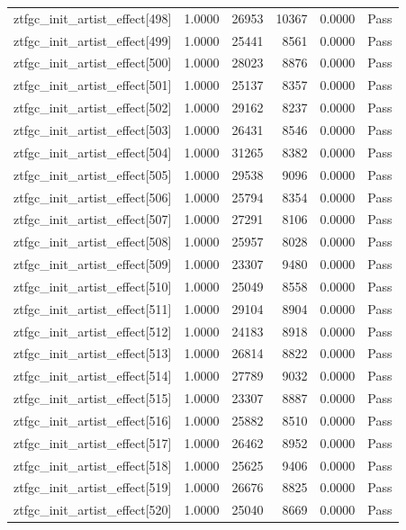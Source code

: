 \begin{table}[htbp]
\begin{tabular}{llrrll}
ztfgc\_init\_artist\_effect[498] & 1.0000 & 26953 & 10367 & 0.0000 & Pass \\
ztfgc\_init\_artist\_effect[499] & 1.0000 & 25441 & 8561 & 0.0000 & Pass \\
ztfgc\_init\_artist\_effect[500] & 1.0000 & 28023 & 8876 & 0.0000 & Pass \\
ztfgc\_init\_artist\_effect[501] & 1.0000 & 25137 & 8357 & 0.0000 & Pass \\
ztfgc\_init\_artist\_effect[502] & 1.0000 & 29162 & 8237 & 0.0000 & Pass \\
ztfgc\_init\_artist\_effect[503] & 1.0000 & 26431 & 8546 & 0.0000 & Pass \\
ztfgc\_init\_artist\_effect[504] & 1.0000 & 31265 & 8382 & 0.0000 & Pass \\
ztfgc\_init\_artist\_effect[505] & 1.0000 & 29538 & 9096 & 0.0000 & Pass \\
ztfgc\_init\_artist\_effect[506] & 1.0000 & 25794 & 8354 & 0.0000 & Pass \\
ztfgc\_init\_artist\_effect[507] & 1.0000 & 27291 & 8106 & 0.0000 & Pass \\
ztfgc\_init\_artist\_effect[508] & 1.0000 & 25957 & 8028 & 0.0000 & Pass \\
ztfgc\_init\_artist\_effect[509] & 1.0000 & 23307 & 9480 & 0.0000 & Pass \\
ztfgc\_init\_artist\_effect[510] & 1.0000 & 25049 & 8558 & 0.0000 & Pass \\
ztfgc\_init\_artist\_effect[511] & 1.0000 & 29104 & 8904 & 0.0000 & Pass \\
ztfgc\_init\_artist\_effect[512] & 1.0000 & 24183 & 8918 & 0.0000 & Pass \\
ztfgc\_init\_artist\_effect[513] & 1.0000 & 26814 & 8822 & 0.0000 & Pass \\
ztfgc\_init\_artist\_effect[514] & 1.0000 & 27789 & 9032 & 0.0000 & Pass \\
ztfgc\_init\_artist\_effect[515] & 1.0000 & 23307 & 8887 & 0.0000 & Pass \\
ztfgc\_init\_artist\_effect[516] & 1.0000 & 25882 & 8510 & 0.0000 & Pass \\
ztfgc\_init\_artist\_effect[517] & 1.0000 & 26462 & 8952 & 0.0000 & Pass \\
ztfgc\_init\_artist\_effect[518] & 1.0000 & 25625 & 9406 & 0.0000 & Pass \\
ztfgc\_init\_artist\_effect[519] & 1.0000 & 26676 & 8825 & 0.0000 & Pass \\
ztfgc\_init\_artist\_effect[520] & 1.0000 & 25040 & 8669 & 0.0000 & Pass \\

\end{tabular}
\end{table}
